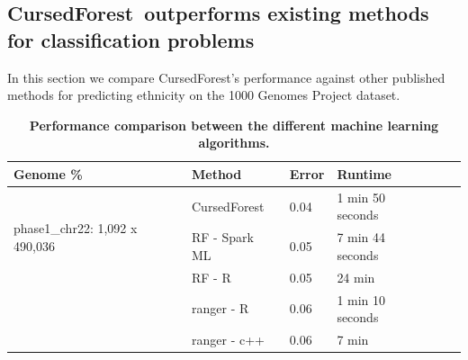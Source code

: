 \documentclass[10pt,letterpaper]{article}
\newcommand{\cursedforest}{{\sc CursedForest}}
\begin{document}
\subsection{\cursedforest\ outperforms existing methods for classification problems}
In this section we compare \cursedforest 's performance against other published methods for predicting ethnicity on the
1000 Genomes Project dataset.

\begin{table}[!ht]
\begin{minipage}{\textwidth}
\centering
\caption{ {\bf Performance comparison between the different machine learning algorithms.}}
\begin{tabular}{|l|l|l|l|l|l||}
\hline
\bf{Genome \%}                      & \bf{Method} & \bf{Error}  & \bf{Runtime}  \\
\hline

\multirow{3}{*}{phase1\_chr22: 1,092 x 490,036} & \cursedforest\ & 0.04  & 1 min 50 seconds                        \\
                                                & RF - Spark ML  &  0.05           &           7 min 44 seconds         \\
                                                & RF - R         & 0.05       & 24 min           \\
                                                & ranger - R      & 0.06       & 1 min 10 seconds       \\
                                                & ranger - c++     & 0.06       & 7 min            \\


\end{tabular}
\end{minipage}
\end{table}
\end{document}
